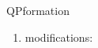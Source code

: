 \begin{mruleclass}{QPformation}
\begin{members}
\begin{member}
\begin{enumerate}
\item modifications:\\

\end{enumerate}

\end{member}
\end{members}

\end{mruleclass}


